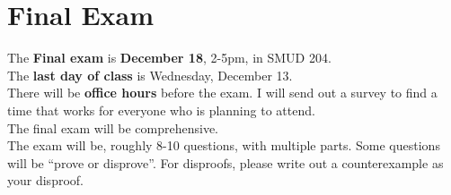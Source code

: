 \documentclass[12pt]{article}
\newcommand{\warning}{
\smallskip
\begin{center}
  {\color{red} {\huge\Stopsign} \hspace{1pt}  IN PROGRESS!} {\color{blue}Check back later for the final assignment.} {\color{red} {\huge\Stopsign} }
\end{center}
\smallskip
\AddToShipoutPictureBG*{\AtTextLowerLeft{\llap{\rotatebox[origin=lb]{90}{\large\sffamily\hspace{2.5in}
  {\color{red} {\huge\Stopsign} \hspace{1pt}  IN PROGRESS!} {\color{blue}Check back later for the final assignment.} {\color{red} {\huge\Stopsign} }
      }\quad\rule{0.8pt}{\textheight}\enspace}}}
}
\begin{document}



\newpage
\section[Final Exam]{Final Exam}


\noindent The \textbf{Final exam} is \textbf{December 18}, 2-5pm, in SMUD 204.
\\

\noindent The \textbf{last day of class} is Wednesday, December 13. 
\\

\noindent There will be \textbf{office hours} before the exam. I will send out a survey to find a time that works for everyone who is planning to attend.%
\\

The final exam will be comprehensive.
\\



The exam will be, roughly 8-10 questions, with multiple parts. Some questions will be ``prove or disprove''. For disproofs, please write out a counterexample as your disproof.
\\
\end{document}
